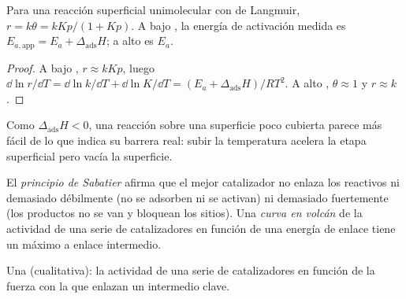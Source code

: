 \begin{proposition}\label{prop:b3:surfaces-catalysis:apparent-ea}
Para una reacción superficial unimolecular con  de Langmuir, $r = k\theta = kKp/(1 + Kp)$.
A bajo , la energía de activación medida es $E_{a,\mathrm{app}} = E_a + \Delta_{\mathrm{ads}}H$; a
alto  es $E_a$.
\end{proposition}

\begin{proof}
A bajo , $r \approx kKp$, luego $\dd\ln r/\dd T = \dd\ln k/\dd T + \dd\ln K/\dd T = (E_a + \Delta_{\mathrm{ads}}H)/RT^2$.
A alto , $\theta \approx 1$ y $r \approx k$.
\end{proof}

Como $\Delta_{\mathrm{ads}}H < 0$, una reacción sobre una superficie poco cubierta parece más fácil de lo que indica su
barrera real: subir la temperatura acelera la etapa superficial pero vacía
la superficie.

\begin{definition}\label{def:b3:surfaces-catalysis:sabatier}
El \emph{principio de Sabatier} afirma que el mejor
catalizador no enlaza los reactivos ni demasiado débilmente (no se adsorben ni se
activan) ni demasiado fuertemente (los productos no se van y bloquean los sitios). Una
\emph{curva en volcán} de la actividad de una serie de
catalizadores en función de una energía de enlace tiene un máximo a enlace intermedio.
\end{definition}

\begin{omfigure}

{\small Una  (cualitativa): la actividad de una serie de catalizadores
en función de la fuerza con la que enlazan un intermedio clave.}
\end{omfigure}

